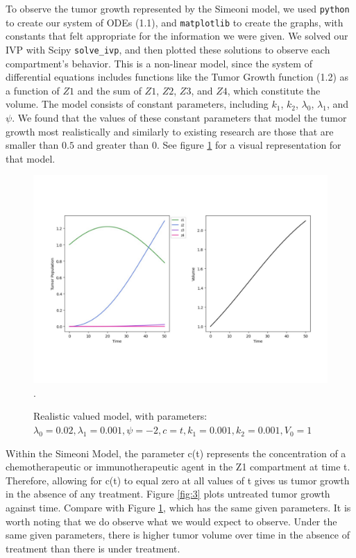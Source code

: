 \documentclass[11pt]{amsart}
\begin{document}
To observe the tumor growth represented by the Simeoni model, we used \verb!python! to create our system of ODEs (1.1), and  \verb!matplotlib! to create the graphs, with constants that felt appropriate for the information we were given. We solved our IVP with Scipy \verb!solve_ivp!, and then plotted these solutions to observe each compartment's behavior. This is a non-linear model, since the system of differential equations includes functions like the Tumor Growth function (1.2) as a function of $Z1$ and the sum of $Z1$, $Z2$, $Z3$, and $Z4$, which constitute the volume. The model consists of constant parameters, including $k_1$, $k_2$, $\lambda_0$, $\lambda_1$, and $\psi$. We found that the values of these constant parameters that model the tumor growth most realistically and similarly to existing research \cite{Koziol_Falls_Schnitzer_2020} are those that are smaller than $0.5$ and greater than $0$. See figure \ref{fig:2} for a visual representation for that model. 
\begin{figure}[h]
\begin{center} %
\includegraphics[width=\textwidth]{parameters_like_paper.pdf}. %
\end{center}
\caption{Realistic valued model, with parameters: $\lambda_0=0.02, \lambda_1=0.001, \psi=-2, c=t, k_1=0.001, k_2=0.001, V_0=1$}
\label{fig:2}
\end{figure}

Within the Simeoni Model, the parameter c(t) represents the concentration of a chemotherapeutic or immunotherapeutic agent in the Z1 compartment at time t. Therefore, allowing for c(t) to equal zero at all values of t gives us tumor growth in the absence of any treatment. Figure \ref{fig:3} plots untreated tumor growth against time. Compare with Figure \ref{fig:2}, which has the same given parameters. It is worth noting that we do observe what we would expect to observe. Under the same given parameters, there is higher tumor volume over time in the absence of treatment than there is under treatment.
\end{document}
